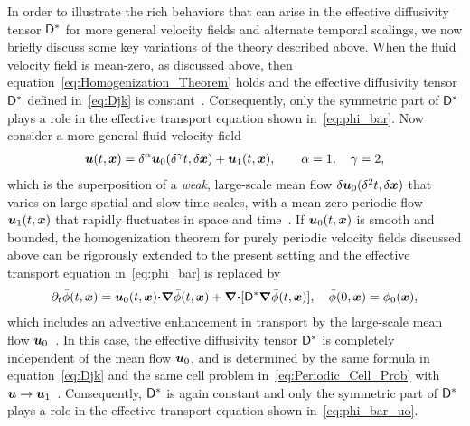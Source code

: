 \documentclass[amsa]{ipart}
\begin{document}
In order to illustrate the rich behaviors that can arise in the effective
diffusivity tensor $\mathsf{D}^*$ for more general velocity fields and
alternate temporal scalings, we now briefly discuss some key variations
of the theory described above. When the 
fluid velocity field is mean-zero, as discussed above, then
equation~\eqref{eq:Homogenization_Theorem} holds and the effective
diffusivity tensor $\mathsf{D}^*$ defined in~\eqref{eq:Djk} is
constant~\cite{Majda:Kramer:1999:book}. Consequently, only the
symmetric part of $\mathsf{D}^*$ plays a role in the effective transport
equation shown in~\eqref{eq:phi_bar}. Now consider a more general
fluid velocity field
%
\begin{align}\label{eq:Velocity_field_uo_u1}
  \vecu(t,\vecx)=\delta^\alpha\vecu_0(\delta^\gamma t,\delta\vecx)+\vecu_1(t,\vecx),
  \qquad
  \alpha=1, \quad
  \gamma=2,
\end{align}
%
which is the superposition of a \emph{weak}, large-scale mean flow
$\delta\boldsymbol{u}_0(\delta^2t,\delta\boldsymbol{x})$ that varies on large spatial and slow time
scales, with a mean-zero periodic flow $\boldsymbol{u}_1(t,\boldsymbol{x})$ that rapidly
fluctuates in space and time~\cite{Majda:Kramer:1999:book}.
If $\boldsymbol{u}_0(t,\boldsymbol{x})$ is smooth and bounded, the homogenization
theorem for purely periodic velocity fields discussed above can be
rigorously extended to the present setting and the effective transport
equation in~\eqref{eq:phi_bar} is replaced
by~\cite{Majda:Kramer:1999:book}   
%
\begin{align}\label{eq:phi_bar_uo}
  \partial_t\bar{\phi}(t,\vecx)=\vecu_0(t,\vecx)\bcdot\bnabla\bar{\phi}(t,\vecx)
                   +\bnabla\bcdot[\Dm^*\bnabla\bar{\phi}(t,\vecx)],
  \quad 
  \bar{\phi}(0,\vecx)=\phi_0(\vecx),
\end{align}
%
which includes an advective enhancement in transport by the
large-scale mean flow $\boldsymbol{u}_0$~\cite{Majda:Kramer:1999:book}. In this
case, the effective diffusivity tensor $\mathsf{D}^*$ is completely
independent of the mean flow $\boldsymbol{u}_0$, and is determined by the same
formula in equation~\eqref{eq:Djk} and the same cell problem
in~\eqref{eq:Periodic_Cell_Prob} with
$\boldsymbol{u}\to\boldsymbol{u}_1$~\cite{Majda:Kramer:1999:book}. Consequently, $\mathsf{D}^*$
is again constant and only the symmetric part of $\mathsf{D}^*$ plays
a role in the effective transport equation shown
in~\eqref{eq:phi_bar_uo}.
\end{document}
